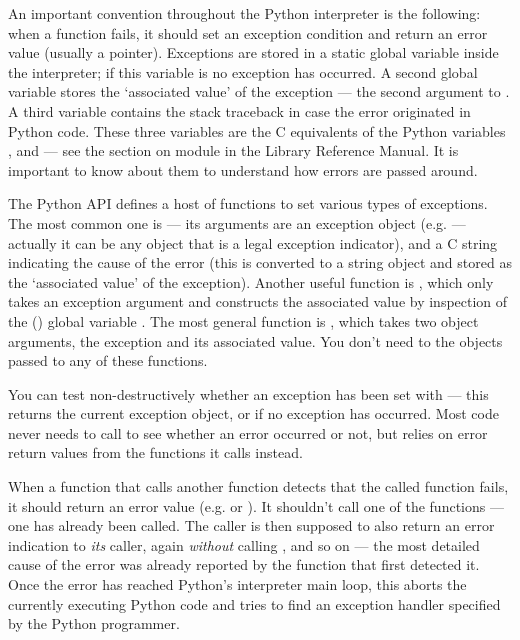 An important convention throughout the Python interpreter is the
following: when a function fails, it should set an exception condition
and return an error value (usually a  pointer).  Exceptions
are stored in a static global variable inside the interpreter; if
this variable is  no exception has occurred.  A second
global variable stores the `associated value' of the exception
--- the second argument to .  A third variable contains
the stack traceback in case the error originated in Python code.
These three variables are the C equivalents of the Python variables
,  and 
--- see the section on module  in the Library Reference
Manual.  It is important to know about them to understand how errors
are passed around.

The Python API defines a host of functions to set various types of
exceptions.  The most common one is  --- its
arguments are an exception object (e.g.  ---
actually it can be any object that is a legal exception indicator),
and a C string indicating the cause of the error (this is converted to
a string object and stored as the `associated value' of the
exception).  Another useful function is ,
which only takes an exception argument and constructs the associated
value by inspection of the (\UNIX{}) global variable .  The
most general function is , which takes two
object arguments, the exception and its associated value.  You don't
need to  the objects passed to any of these
functions.

You can test non-destructively whether an exception has been set with
 --- this returns the current exception object,
or  if no exception has occurred.  Most code never needs to
call  to see whether an error occurred or not,
but relies on error return values from the functions it calls instead.

When a function that calls another function detects that the called
function fails, it should return an error value (e.g.  or
).  It shouldn't call one of the  functions ---
one has already been called.  The caller is then supposed to also
return an error indication to {\em its} caller, again {\em without}
calling , and so on --- the most detailed cause of the
error was already reported by the function that first detected it. 
Once the error has reached Python's interpreter main loop, this aborts
the currently executing Python code and tries to find an exception
handler specified by the Python programmer.

